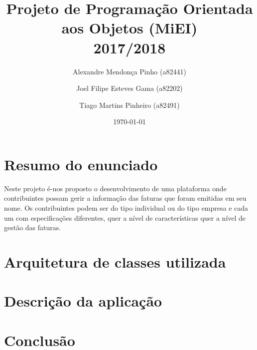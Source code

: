 \documentclass[12pt]{report}
\title{Projeto de Programação Orientada aos Objetos (MiEI) \\ 2017/2018}
\author{Alexandre Mendonça Pinho (a82441) \and Joel Filipe Esteves Gama (a82202) \and Tiago Martins Pinheiro (a82491)}
\date{\today}
\newcommand\tab[1][0.5cm]{\hspace*{#1}}
\begin{document}
\maketitle

\tableofcontents

\chapter{Resumo do enunciado}
\label{sec:resumo}

\tab Neste projeto é-nos proposto o desenvolvimento de uma plataforma onde contribuintes possam gerir a informação das faturas que foram emitidas em seu nome. Os contribuintes podem ser do tipo individual ou do tipo empresa e cada um com especificações diferentes, quer a nível de características quer a nível de gestão das faturas.

\chapter{Arquitetura de classes utilizada}
\label{sec:resumo}

\chapter{Descrição da aplicação}
\label{sec:resumo}

\chapter{Conclusão}
\label{sec:resumo}
\end{document}
